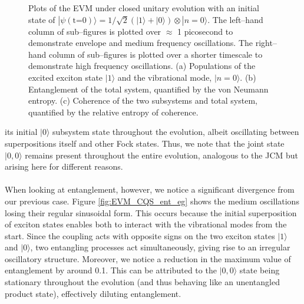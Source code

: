 \documentclass[11pt]{article}
\begin{document}
\begin{figure}[H]
    \caption{Plots of the EVM under closed unitary evolution with an initial state of $|\psi (\text{t=0})\rangle = 1/\sqrt{2}(|1\rangle + |0\rangle)\otimes|n=0\rangle$. The left--hand column of sub--figures is plotted over $\approx$ 1 picosecond to demonstrate envelope and medium frequency oscillations. The right--hand column of sub--figures is plotted over a shorter timescale to demonstrate high frequency oscillations. (a) Populations of the excited exciton state $|1\rangle$ and the vibrational mode, $|n=0\rangle$. (b) Entanglement of the total system, quantified by the von Neumann entropy. (c) Coherence of the two subsystems and total system, quantified by the relative entropy of coherence.} 
    \label{fig:EVM_CQS_eg}
\end{figure}

\noindent its initial $|0\rangle$ subsystem state throughout the evolution, albeit oscillating between superpositions itself and other Fock states. Thus, we note that the joint state $|0,0\rangle$ remains present throughout the entire evolution, analogous to the JCM but arising here for different reasons. \\
\\
When looking at entanglement, however, we notice a significant divergence from our previous case. Figure \ref{fig:EVM_CQS_ent_eg} shows the medium oscillations losing their regular sinusoidal form. This occurs because the initial superposition of exciton states enables both to interact with the vibrational modes from the start. Since the coupling acts with opposite signs on the two exciton states $|1\rangle$ and $|0\rangle$, two entangling processes act simultaneously, giving rise to an irregular oscillatory structure. Moreover, we notice a reduction in the maximum value of entanglement by around 0.1. This can be attributed to the $|0,0\rangle$ state being stationary throughout the evolution (and thus behaving like an unentangled product state), effectively diluting entanglement.\\
\\
\end{document}
